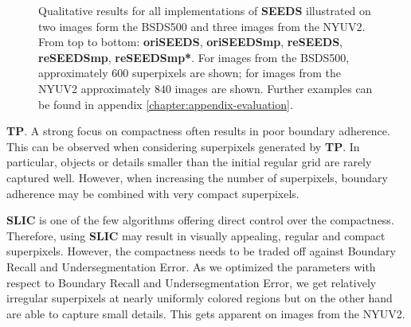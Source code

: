 \begin{figure}[t]
{	}
	\caption[Qualitative results for all implementations of \textbf{SEEDS} \cite{VanDenBerghBoixRoigCapitaniVanGool:2012} on images from the Berkeley Segmentation Dataset \cite{ArbelaezMaireFowlkesMalik:2011} and the NYU Depth Dataset \cite{SilbermanHoiemKohliFergus:2012}.]{Qualitative results for all implementations of \textbf{SEEDS} illustrated on two images form the BSDS500 and three images from the NYUV2. From top to bottom: \textbf{oriSEEDS}, \textbf{oriSEEDSmp}, \textbf{reSEEDS}, \textbf{reSEEDSmp}, \textbf{reSEEDSmp*}. For images from the BSDS500, approximately $600$ superpixels are shown; for images from the NYUV2 approximately $840$ images are shown. Further examples can be found in appendix \ref{chapter:appendix-evaluation}.}
	\label{fig:evaluation-qualitative-seeds}
\end{figure}

\textbf{TP}. A strong focus on compactness often results in poor boundary adherence. This can be observed when considering superpixels generated by \textbf{TP}. In particular, objects or details smaller than the initial regular grid are rarely captured well. However, when increasing the number of superpixels, boundary adherence may be combined with very compact superpixels.

\textbf{SLIC} is one of the few algorithms offering direct control over the compactness. Therefore, using \textbf{SLIC} may result in visually appealing, regular and compact superpixels. However, the compactness needs to be traded off against Boundary Recall and Undersegmentation Error. As we optimized the parameters with respect to Boundary Recall and Undersegmentation Error, we get relatively irregular superpixels at nearly uniformly colored regions but on the other hand are able to capture small details. This gets apparent on images from the NYUV2.


